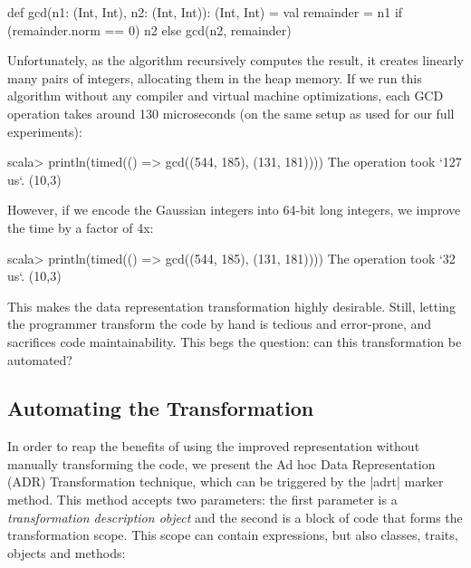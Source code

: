 \begin{lstlisting-nobreak}
def gcd(n1: (Int, Int), n2: (Int, Int)): (Int, Int) = {
  val remainder = n1 %
  if (remainder.norm == 0) n2 else gcd(n2, remainder)
}
\end{lstlisting-nobreak}

Unfortunately, as the algorithm recursively computes the result, it creates linearly many pairs of integers, allocating them in the heap memory. If we run this algorithm without any compiler
and virtual machine %
optimizations, each GCD operation takes around 130
microseconds (on the same setup as used for our full experiments):

\begin{lstlisting-nobreak}
scala>   println(timed(() => gcd((544, 185), (131, 181))))
The operation took `127 us`.
(10,3)
\end{lstlisting-nobreak}

However, if we encode the Gaussian integers into 64-bit long integers, we improve the time by a factor of 4x:

\begin{lstlisting-nobreak}
scala> println(timed(() => gcd((544, 185), (131, 181))))
The operation took `32 us`.
(10,3)
\end{lstlisting-nobreak}

This makes the data representation transformation highly desirable. Still, letting the programmer transform the code by hand is tedious and error-prone, and sacrifices code maintainability. This begs the question: can this transformation be automated?

\subsection{Automating the Transformation}
\label{sec:automating}

In order to reap the benefits of using the improved representation
without manually transforming the code, we present the Ad hoc Data
Representation (ADR) Transformation technique, which can be triggered
by the |adrt| marker method. This method accepts two parameters: the
first parameter is a \emph{transformation description object} and the
second is a block of code that forms the transformation scope. This
scope can contain expressions, but also classes, traits, objects and
methods:

